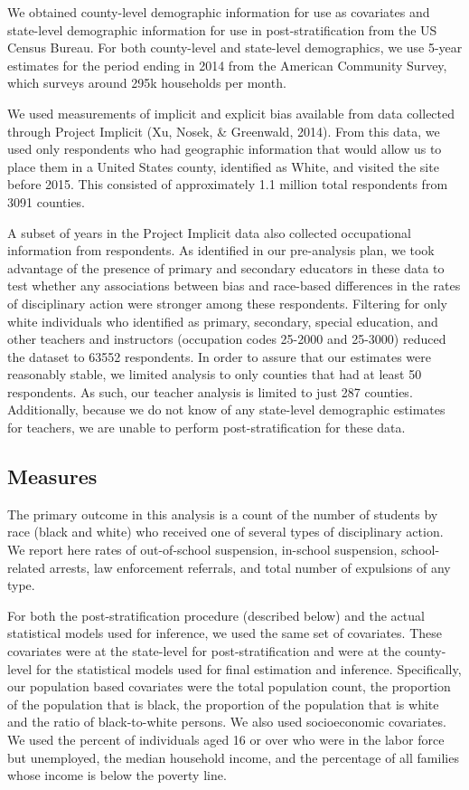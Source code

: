 \documentclass[english,floatsintext,man]{apa6}
\theoremstyle{definition}
\theoremstyle{definition}
\theoremstyle{remark}
\begin{document}
We obtained county-level demographic information for use as covariates
and state-level demographic information for use in post-stratification
from the US Census Bureau. For both county-level and state-level
demographics, we use 5-year estimates for the period ending in 2014 from
the American Community Survey, which surveys around 295k households per
month.

We used measurements of implicit and explicit bias available from data
collected through Project Implicit (Xu, Nosek, \& Greenwald, 2014). From
this data, we used only respondents who had geographic information that
would allow us to place them in a United States county, identified as
White, and visited the site before 2015. This consisted of approximately
1.1 million total respondents from 3091 counties.

A subset of years in the Project Implicit data also collected
occupational information from respondents. As identified in our
pre-analysis plan, we took advantage of the presence of primary and
secondary educators in these data to test whether any associations
between bias and race-based differences in the rates of disciplinary
action were stronger among these respondents. Filtering for only white
individuals who identified as primary, secondary, special education, and
other teachers and instructors (occupation codes 25-2000 and 25-3000)
reduced the dataset to 63552 respondents. In order to assure that our
estimates were reasonably stable, we limited analysis to only counties
that had at least 50 respondents. As such, our teacher analysis is
limited to just 287 counties. Additionally, because we do not know of
any state-level demographic estimates for teachers, we are unable to
perform post-stratification for these data.

\subsection{Measures}\label{measures}

The primary outcome in this analysis is a count of the number of
students by race (black and white) who received one of several types of
disciplinary action. We report here rates of out-of-school suspension,
in-school suspension, school-related arrests, law enforcement referrals,
and total number of expulsions of any type.

For both the post-stratification procedure (described below) and the
actual statistical models used for inference, we used the same set of
covariates. These covariates were at the state-level for
post-stratification and were at the county-level for the statistical
models used for final estimation and inference. Specifically, our
population based covariates were the total population count, the
proportion of the population that is black, the proportion of the
population that is white and the ratio of black-to-white persons. We
also used socioeconomic covariates. We used the percent of individuals
aged 16 or over who were in the labor force but unemployed, the median
household income, and the percentage of all families whose income is
below the poverty line.
\end{document}
